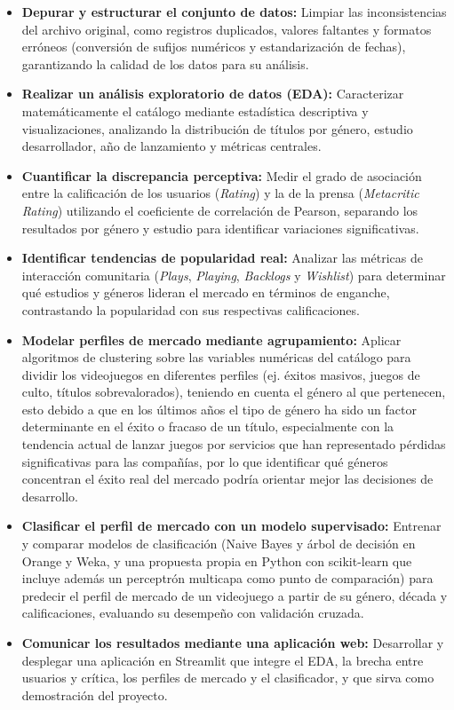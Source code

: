 \documentclass[letterpaper,11pt]{article}
\begin{document}
\begin{itemize}
    \item \textbf{Depurar y estructurar el conjunto de datos:} Limpiar las inconsistencias del archivo original, como registros duplicados, valores faltantes y formatos erróneos (conversión de sufijos numéricos y estandarización de fechas), garantizando la calidad de los datos para su análisis.
    \item \textbf{Realizar un análisis exploratorio de datos (EDA):} Caracterizar matemáticamente el catálogo mediante estadística descriptiva y visualizaciones, analizando la distribución de títulos por género, estudio desarrollador, año de lanzamiento y métricas centrales.
    \item \textbf{Cuantificar la discrepancia perceptiva:} Medir el grado de asociación entre la calificación de los usuarios (\textit{Rating}) y la de la prensa (\textit{Metacritic Rating}) utilizando el coeficiente de correlación de Pearson, separando los resultados por género y estudio para identificar variaciones significativas.
    \item \textbf{Identificar tendencias de popularidad real:} Analizar las métricas de interacción comunitaria (\textit{Plays}, \textit{Playing}, \textit{Backlogs} y \textit{Wishlist}) para determinar qué estudios y géneros lideran el mercado en términos de enganche, contrastando la popularidad con sus respectivas calificaciones.
    \item \textbf{Modelar perfiles de mercado mediante agrupamiento:} Aplicar algoritmos de clustering sobre las variables numéricas del catálogo para dividir los videojuegos en diferentes perfiles (ej. éxitos masivos, juegos de culto, títulos sobrevalorados), teniendo en cuenta el género al que pertenecen, esto debido a que en los últimos años el tipo de género ha sido un factor determinante en el éxito o fracaso de un título, especialmente con la tendencia actual de lanzar juegos por servicios que han representado pérdidas significativas para las compañías, por lo que identificar qué géneros concentran el éxito real del mercado podría orientar mejor las decisiones de desarrollo.
    \item \textbf{Clasificar el perfil de mercado con un modelo supervisado:} Entrenar y comparar modelos de clasificación (Naive Bayes y árbol de decisión en Orange y Weka, y una propuesta propia en Python con scikit-learn que incluye además un perceptrón multicapa como punto de comparación) para predecir el perfil de mercado de un videojuego a partir de su género, década y calificaciones, evaluando su desempeño con validación cruzada.
    \item \textbf{Comunicar los resultados mediante una aplicación web:} Desarrollar y desplegar una aplicación en Streamlit que integre el EDA, la brecha entre usuarios y crítica, los perfiles de mercado y el clasificador, y que sirva como demostración del proyecto.
\end{itemize}
\end{document}

